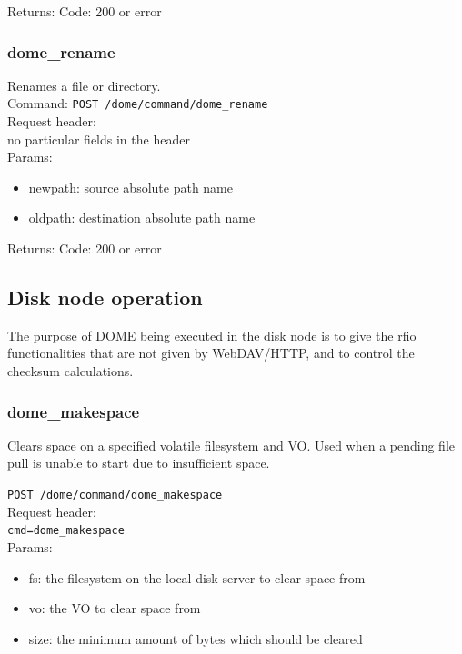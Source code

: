 \documentclass[a4paper,10pt]{scrreprt}
\begin{document}
Returns:
Code: 200 or error



\subsubsection{dome\_rename}

Renames a file or directory.\\
Command:
\lstinline"POST /dome/command/dome_rename"\\

Request header:\\
no particular fields in the header\\

Params:
\begin{itemize}
 \item newpath: source absolute path name
 \item oldpath: destination absolute path name
\end{itemize}

Returns:
Code: 200 or error




\subsection{Disk node operation}
The purpose of DOME being executed in the disk node is to give the rfio functionalities that are not
given by WebDAV/HTTP, and to control the checksum calculations.\\

\subsubsection{dome\_makespace}

Clears space on a specified volatile filesystem and VO. Used when a pending file pull is unable to start
due to insufficient space.

\lstinline"POST /dome/command/dome_makespace"\\

Request header:\\
\lstinline"cmd=dome_makespace"\\

Params:
\begin{itemize}
 \item fs: the filesystem on the local disk server to clear space from
 \item vo: the VO to clear space from
 \item size: the minimum amount of bytes which should be cleared
\end{itemize}
\end{document}
